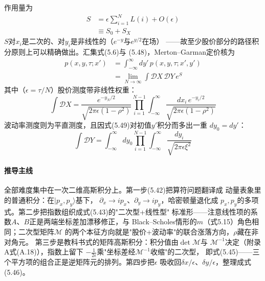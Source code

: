 作用量为
\begin{align*}
S&=\epsilon\sum_{i=1}^{N}L(i)+O(\epsilon)\\
&\equiv S_{0}+S_{X}
\tag{5.48}
\end{align*}
$S$对$x_{i}$是二次的、对$y_{i}$是非线性的（$e^{-y}$与$e^{y/2}$在场）
——故至少股价部分的路径积分原则上可以精确做出。汇集式(5.6)与
(5.48)，Merton--Garman定价核为
\begin{align*}
p(x,y,\tau;x')&=\int_{-\infty}^{\infty}dy'\,p(x,y,\tau;x',y')\\
&=\lim_{N\to\infty}\int\mathcal{D}X\,\mathcal{D}Y\,e^{S}
\tag{5.49}
\end{align*}
其中（$\epsilon=\tau/N$）股价测度带非线性权重：
\begin{equation*}
\int\mathcal{D}X=\frac{e^{-y_{N}/2}}{\sqrt{2\pi\epsilon(1-\rho^{2})}}
\prod_{i=1}^{N-1}\int_{-\infty}^{\infty}
\frac{dx_{i}\,e^{-y_{i}/2}}{\sqrt{2\pi\epsilon(1-\rho^{2})}}
\tag{5.50}
\end{equation*}
波动率测度则为平直测度，且因式(5.49)对初值$y'$积分而多出一重
$dy_{0}=dy'$：
\begin{equation*}
\int\mathcal{D}Y=\int_{-\infty}^{\infty}dy_{0}
\prod_{i=1}^{N-1}\int_{-\infty}^{\infty}
\frac{dy_{i}}{\sqrt{2\pi\epsilon\xi^{2}}}
\tag{5.51}
\end{equation*}

\paragraph{推导主线}
全部难度集中在一次二维高斯积分上。第一步(5.42)把算符问题翻译成
动量表象里的普通积分：在$\vert p_{x},p_{y}\rangle$基下，
$\partial_{x}\to ip_{x}$、$\partial_{y}\to ip_{y}$，哈密顿量退化成
$p_{x},p_{y}$的多项式。第二步把指数组织成式(5.43)的"二次型+线性型"
标准形——注意线性项的系数$A$、$B$正是两端坐标差加漂移修正，与
Black--Scholes情形的$m$（式5.15）角色相同；二次型矩阵$\mathcal{M}$
的两个本征方向就是"股价+波动率"的联合涨落方向，$\rho$藏在非对角元。
第三步是教科书式的矩阵高斯积分：积分值由$\det\mathcal{M}$与
$\mathcal{M}^{-1}$决定（附录A式(A.18)），指数上留下
$-\frac{1}{2\epsilon}$乘"坐标差经$\mathcal{M}^{-1}$收缩"的二次型，
即式(5.45)——三个平方项的组合正是逆矩阵元的排列。第四步把$\epsilon$
吸收回$\delta x/\epsilon$、$\delta y/\epsilon$，整理成式(5.46)。

